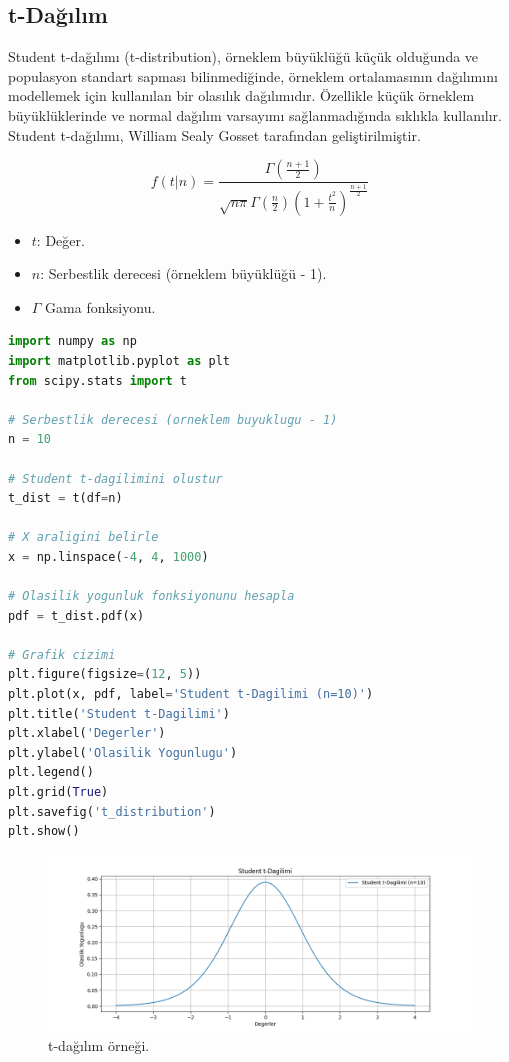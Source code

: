 \subsection{t-Dağılım}
Student t-dağılımı (t-distribution), örneklem büyüklüğü küçük olduğunda ve populasyon standart sapması bilinmediğinde, örneklem ortalamasının dağılımını modellemek için kullanılan bir olasılık dağılımıdır. Özellikle küçük örneklem büyüklüklerinde ve normal dağılım varsayımı sağlanmadığında sıklıkla kullanılır. Student t-dağılımı, William Sealy Gosset tarafından geliştirilmiştir.

\[f(t|n) = \frac{\Gamma\left(\frac{n+1}{2}\right)}{\sqrt{n\pi}\Gamma\left(\frac{n}{2}\right)\left(1+\frac{t^2}{n}\right)^{\frac{n+1}{2}}}\]
\begin{itemize}
	\item $t$: Değer.
	\item $n$: Serbestlik derecesi (örneklem büyüklüğü - 1).
	\item $\Gamma$ Gama fonksiyonu.
\end{itemize}

\begin{lstlisting}[language=Python]
import numpy as np
import matplotlib.pyplot as plt
from scipy.stats import t

# Serbestlik derecesi (orneklem buyuklugu - 1)
n = 10

# Student t-dagilimini olustur
t_dist = t(df=n)

# X araligini belirle
x = np.linspace(-4, 4, 1000)

# Olasilik yogunluk fonksiyonunu hesapla
pdf = t_dist.pdf(x)

# Grafik cizimi
plt.figure(figsize=(12, 5))
plt.plot(x, pdf, label='Student t-Dagilimi (n=10)')
plt.title('Student t-Dagilimi')
plt.xlabel('Degerler')
plt.ylabel('Olasilik Yogunlugu')
plt.legend()
plt.grid(True)
plt.savefig('t_distribution')
plt.show()
\end{lstlisting}

\begin{figure}[h]
    \centering
    \includegraphics[width=1\textwidth]{images/t_distribution.png}
    \caption{t-dağılım örneği.}
    \label{fig:enter-label}
\end{figure}

